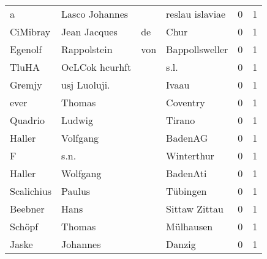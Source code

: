 \begin{tabular}{llllrr}
                        a &                     Lasco Johannes &             &                             reslau islaviae &          0 &         1 \\
                 CiMibray &                       Jean Jacques &          de &                                        Chur &          0 &         1 \\
                  Egenolf &                        Rappolstein &         von &                              Bappollsweller &          0 &         1 \\
                    TluHA &                     OcLCok hcurhft &             &                                        s.l. &          0 &         1 \\
                   Gremjy &                       usj Luoluji. &             &                                       Ivaau &          0 &         1 \\
                     ever &                             Thomas &             &                                    Coventry &          0 &         1 \\
                  Quadrio &                             Ludwig &             &                                      Tirano &          0 &         1 \\
                   Haller &                           Volfgang &             &                                     BadenAG &          0 &         1 \\
                        F &                               s.n. &             &                                  Winterthur &          0 &         1 \\
                   Haller &                           Wolfgang &             &                                    BadenAti &          0 &         1 \\
               Scalichius &                             Paulus &             &                                    Tübingen &          0 &         1 \\
                  Beebner &                               Hans &             &                               Sittaw Zittau &          0 &         1 \\
                   Schöpf &                             Thomas &             &                                   Mülhausen &          0 &         1 \\
                    Jaske &                           Johannes &             &                                      Danzig &          0 &         1 \\

\end{tabular}

